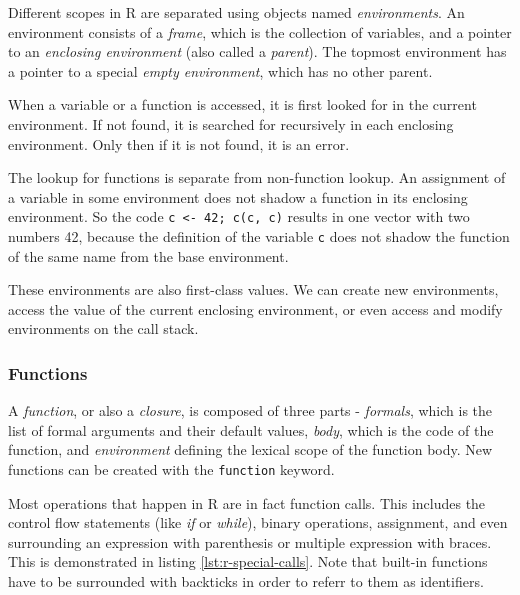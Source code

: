 Different scopes in R are separated using objects named \textit{environments}. An environment consists of a \textit{frame}, which is the collection of variables, and a pointer to an \textit{enclosing environment} (also called a \textit{parent}). The topmost environment has a pointer to a special \textit{empty environment}, which has no other parent.

When a variable or a function is accessed, it is first looked for in the current environment. If not found, it is searched for recursively in each enclosing environment. Only then if it is not found, it is an error.

The lookup for functions is separate from non-function lookup. An assignment of a variable in some environment does not shadow a function in its enclosing environment. So the code \texttt{c <- 42; c(c, c)} results in one vector with two numbers 42, because the definition of the variable \texttt{c} does not shadow the function of the same name from the base environment.

These environments are also first-class values. We can create new environments, access the value of the current enclosing environment, or even access and modify environments on the call stack.

\subsubsection*{Functions}

A \textit{function}, or also a \textit{closure}, is composed of three parts - \textit{formals}, which is the list of formal arguments and their default values, \textit{body}, which is the code of the function, and \textit{environment} defining the lexical scope of the function body. New functions can be created with the \texttt{function} keyword.

Most operations that happen in R are in fact function calls. This includes the control flow statements (like \textit{if} or \textit{while}), binary operations, assignment, and even surrounding an expression with parenthesis or multiple expression with braces. This is demonstrated in listing \ref{lst:r-special-calls}. Note that built-in functions have to be surrounded with backticks in order to referr to them as identifiers.

